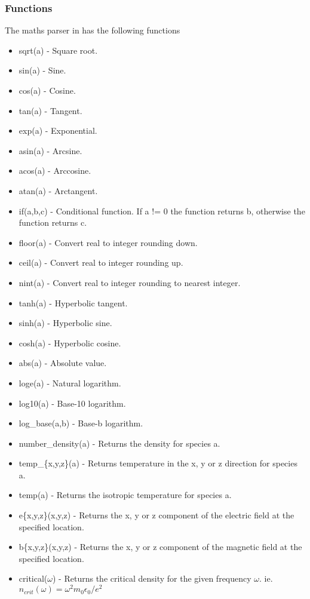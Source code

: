 \subsubsection{Functions}
\label{sec:functions}
The maths parser in {\EPOCH} has the following functions
\begin{itemize}
\item sqrt(a) - Square root.
\item sin(a) - Sine.
\item cos(a) - Cosine.
\item tan(a) - Tangent.
\item exp(a) - Exponential.
\item asin(a) - Arcsine.
\item acos(a) - Arccosine.
\item atan(a) - Arctangent.
\item if(a,b,c) - Conditional function. If a != 0 the function returns b,
  otherwise the function returns c.
\item floor(a) - Convert real to integer rounding down.
\item ceil(a) - Convert real to integer rounding up.
\item nint(a) - Convert real to integer rounding to nearest integer.
\item tanh(a) - Hyperbolic tangent.
\item sinh(a) - Hyperbolic sine.
\item cosh(a) - Hyperbolic cosine.
\item abs(a) - Absolute value.
\item loge(a) - Natural logarithm.
\item log10(a) - Base-10 logarithm.
\item log\_base(a,b) - Base-b logarithm.
\item number\_density(a) - Returns the density for species a.
\item temp\_\{x,y,z\}(a) - Returns temperature in the x, y or z direction for species a.
\item temp(a) - Returns the isotropic temperature for species a.
\item e\{x,y,z\}(x,y,z) - Returns the x, y or z component of the electric
    field at the specified location.
\item b\{x,y,z\}(x,y,z) - Returns the x, y or z component of the magnetic
    field at the specified location.
\item critical($\omega$) - Returns the critical density for the given
    frequency $\omega$. ie. $n_{crit}(\omega) = \omega^2 m_0 \epsilon_0 / e^2$

\end{itemize}
